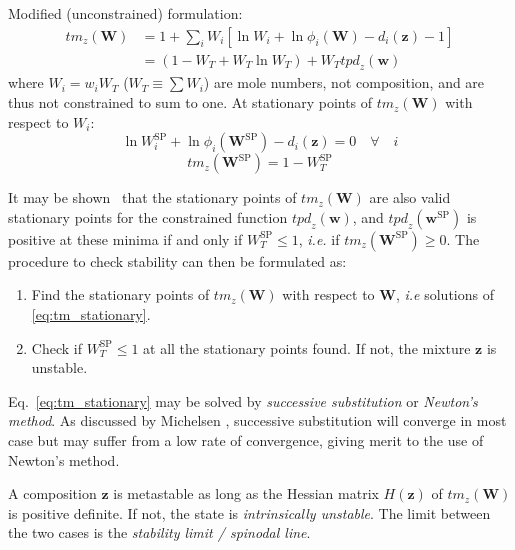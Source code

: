 \documentclass[english]{../thermomemo/thermomemo}
\newcommand*{\vektor}[1]{\boldsymbol{#1}}%
\begin{document}
Modified (unconstrained) formulation:
\begin{align}
  \mathit{tm}_z(\vektor{W}) &= 1 + \sum_{i} W_i \left[ \ln W_i + \ln \phi_i(\vektor{W}) - d_i(\vektor{z}) -1\right]
  \nonumber\\
  &= \left( 1 - W_T + W_T \ln W_T \right) + W_T \mathit{tpd}_z(\vektor{w})
  \label{eq:tm}
\end{align}
where $W_i = w_i W_T$ ($W_T \equiv \sum W_i $) are mole numbers, not composition, and are thus not constrained to sum to one.
At stationary points of $\mathit{tm}_z(\vektor{W})$ with respect to $W_i$:
\begin{equation}
  \ln W_i^\text{SP} + \ln \phi_i(\vektor{W}^\text{SP}) - d_i(\vektor{z}) = 0 \quad \forall \quad i
  \label{eq:tm_stationary}
\end{equation}
\begin{equation}
  \mathit{tm}_z(\vektor{W}^\text{SP}) = 1 - W_T^\text{SP} 
  \label{}
\end{equation}

It may be shown~\cite[Ch.~9]{michelsen07} that the stationary points of
$\mathit{tm}_z(\vektor{W})$ are also valid stationary points for the
constrained function $\mathit{tpd}_z(\vektor{w})$, and
$\mathit{tpd}_z(\vektor{w}^\text{SP})$ is positive at these minima if and only
if $W_T^\text{SP} \leq 1$, \textit{i.e.} if
$\mathit{tm}_z(\vektor{W}^\text{SP}) \geq 0$. The procedure to check stability
can then be formulated as:
\begin{framed}
\begin{enumerate}
  \item Find the stationary points of $\mathit{tm}_z(\vektor{W})$ with respect to $\vektor{W}$, \textit{i.e} solutions of \eqref{eq:tm_stationary}.
  \item Check if $W_T^\text{SP} \leq 1$ at all the stationary points found. If not, the mixture $\vektor{z}$ is unstable.
\end{enumerate}
\end{framed}
Eq.~\eqref{eq:tm_stationary} may be solved by \textit{successive substitution}
or \textit{Newton's method}. As discussed by Michelsen \cite{michelsen07},
successive substitution will converge in most case but may suffer from a low
rate of convergence, giving merit to the use of Newton's method. 

A composition $\vektor{z}$ is metastable as long as the Hessian matrix 
$H(\vektor{z})$ 
of $\mathit{tm}_z(\vektor{W})$ is positive definite. 
If not, the state is \textit{intrinsically unstable}. 
The limit between the two cases is the 
\textit{stability limit / spinodal line}.
\end{document}
